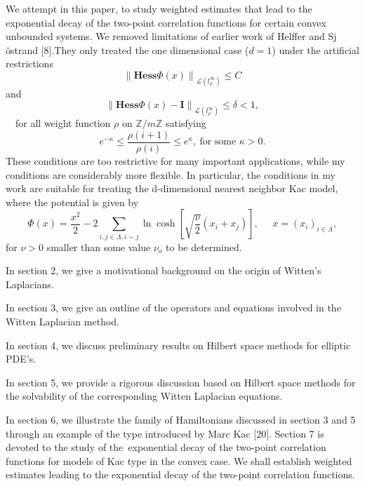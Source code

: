 \documentclass{article}
\begin{document}
We attempt in this paper, to study weighted estimates that lead to the
exponential decay of the two-point correlation functions for certain convex
unbounded systems. We removed limitations of earlier work of Helffer and Sj%
\"{o}strand [8].They only treated the one dimensional case ($d=1$) under the
artificial restrictions%
\begin{equation*}
\left\| \mathbf{Hess}\Phi (x)\right\| _{\mathcal{L}(l_{\rho }^{\infty
})}\leq C
\end{equation*}%
and 
\begin{equation*}
\left\| \mathbf{Hess}\Phi (x)-\mathbf{I}\right\| _{\mathcal{L}(l_{\rho
}^{\infty })}\leq \delta <1,
\end{equation*}%
\ \ for all weight function $\rho $ on $\mathbb{Z}/m\mathbb{Z}$ satisfying%
\begin{equation*}
e^{-\kappa }\leq \frac{\rho \left( i+1\right) }{\rho (i)}\leq e^{\kappa },\ 
\text{for some }\kappa >0.
\end{equation*}%
These conditions are too restrictive for many important applications, while
my conditions are considerably more flexible. In particular, the conditions
in my work are suitable for treating the d-dimensional nearest neighbor Kac
model, where the potential is given by 
\begin{equation*}
\Phi (x)=\frac{x^{2}}{2}-2\sum_{i,j\in \Lambda ,i\sim j}\ln \cosh \left[ 
\sqrt{\frac{\nu }{2}}\left( x_{i}+x_{j}\right) \right] ,\;\;\;\;\;x=\left(
x_{i}\right) _{i\in \Lambda },
\end{equation*}%
for $\nu >0$ smaller than some value $\nu _{o}$ to be determined.

In section 2, we give a motivational background on the origin of Witten's
Laplacians.

In section 3, we give an outline of the operators and equations involved in
the Witten Laplacian method.

In section 4, we discuss preliminary results on Hilbert space methods for
elliptic PDE's.

In section 5, we provide a rigorous discussion based on Hilbert space
methods for the solvability of the corresponding Witten Laplacian equations.

In section 6, we illustrate the family of Hamiltonians discussed in section
3 and 5 through an example of the type introduced by Marc Kac [20]. Section
7 is devoted to the study of the\ exponential decay of the two-point
correlation functions for models of Kac type in the convex case. We shall
establish weighted estimates leading to the exponential decay of the
two-point correlation functions.
\end{document}
